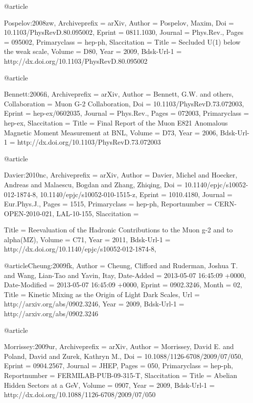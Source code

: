 {{{{{{{{{{@article{Pospelov:2008zw,
	Archiveprefix = {arXiv},
	Author = {Pospelov, Maxim},
	Doi = {10.1103/PhysRevD.80.095002},
	Eprint = {0811.1030},
	Journal = {Phys.Rev.},
	Pages = {095002},
	Primaryclass = {hep-ph},
	Slaccitation = {%
	Title = {{Secluded U(1) below the weak scale}},
	Volume = {D80},
	Year = {2009},
	Bdsk-Url-1 = {http://dx.doi.org/10.1103/PhysRevD.80.095002}
}

@article{Bennett:2006fi,
	Archiveprefix = {arXiv},
	Author = {Bennett, G.W. and others},
	Collaboration = {Muon G-2 Collaboration},
	Doi = {10.1103/PhysRevD.73.072003},
	Eprint = {hep-ex/0602035},
	Journal = {Phys.Rev.},
	Pages = {072003},
	Primaryclass = {hep-ex},
	Slaccitation = {%
	Title = {{Final Report of the Muon E821 Anomalous Magnetic Moment Measurement at BNL}},
	Volume = {D73},
	Year = {2006},
	Bdsk-Url-1 = {http://dx.doi.org/10.1103/PhysRevD.73.072003}
}

@article{Davier:2010nc,
	Archiveprefix = {arXiv},
	Author = {Davier, Michel and Hoecker, Andreas and Malaescu, Bogdan and Zhang, Zhiqing},
	Doi = {10.1140/epjc/s10052-012-1874-8, 10.1140/epjc/s10052-010-1515-z},
	Eprint = {1010.4180},
	Journal = {Eur.Phys.J.},
	Pages = {1515},
	Primaryclass = {hep-ph},
	Reportnumber = {CERN-OPEN-2010-021, LAL-10-155},
	Slaccitation = {%
	Title = {{Reevaluation of the Hadronic Contributions to the Muon g-2 and to alpha(MZ)}},
	Volume = {C71},
	Year = {2011},
	Bdsk-Url-1 = {http://dx.doi.org/10.1140/epjc/s10052-012-1874-8,%
}

@article{Cheung:2009fk,
	Author = {Cheung, Clifford and Ruderman, Joshua T. and Wang, Lian-Tao and Yavin, Itay},
	Date-Added = {2013-05-07 16:45:09 +0000},
	Date-Modified = {2013-05-07 16:45:09 +0000},
	Eprint = {0902.3246},
	Month = {02},
	Title = {{Kinetic Mixing as the Origin of Light Dark Scales}},
	Url = {http://arxiv.org/abs/0902.3246},
	Year = {2009},
	Bdsk-Url-1 = {http://arxiv.org/abs/0902.3246}
}

@article{Morrissey:2009ur,
	Archiveprefix = {arXiv},
	Author = {Morrissey, David E. and Poland, David and Zurek, Kathryn M.},
	Doi = {10.1088/1126-6708/2009/07/050},
	Eprint = {0904.2567},
	Journal = {JHEP},
	Pages = {050},
	Primaryclass = {hep-ph},
	Reportnumber = {FERMILAB-PUB-09-315-T},
	Slaccitation = {%
	Title = {{Abelian Hidden Sectors at a GeV}},
	Volume = {0907},
	Year = {2009},
	Bdsk-Url-1 = {http://dx.doi.org/10.1088/1126-6708/2009/07/050}
}

}}}}}}}}}}}}}}}
